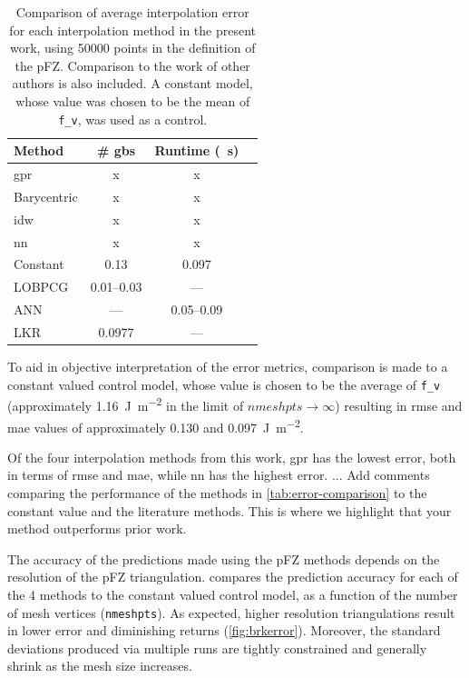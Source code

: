 \documentclass[preprint,12pt]{elsarticle}
\begin{document}
\begin{table}
\caption{Comparison of average interpolation error for each interpolation method in the present work, using \num{50000} points in the definition of the pFZ. Comparison to the work of other authors is also included. A constant model, whose value was chosen to be the mean of \texttt{f\_v}, was used as a control.}
\centering
\begin{tabular}{lccc}
\toprule
Method & \# \glspl{gb} & Runtime (\SI{}{\second}) \\
\midrule
\Gls{gpr} & x & x \\
Barycentric & x & x \\
\gls{idw} & x & x \\
\gls{nn} & x & x \\
Constant & 0.13 & 0.097 \\
LOBPCG \cite{shenDeterminingGrainBoundary2019} & 0.01--0.03 & --- \\
ANN \cite{echeverrirestrepoUsingArtificialNeural2014} & --- & 0.05--0.09 \\
LKR \cite{chesserLearningGrainBoundary2020} & 0.0977 & --- \\
\bottomrule
\end{tabular}
\label{tab:runtime-comparison}
\end{table}

To aid in objective interpretation of the error metrics, comparison is made to a constant valued control model, whose value is chosen to be the average of \texttt{f\_v} (approximately \SI{1.16}{\J\per\square\meter} in the limit of $nmeshpts \rightarrow \infty$) resulting in \gls{rmse} and \gls{mae} values of approximately \num{0.130} and \SI{0.097}{\J\per\square\meter}.

Of the four interpolation methods from this work, \Gls{gpr} has the lowest error, both in terms of \gls{rmse} and \gls{mae}, while \Gls{nn} has the highest error. ... Add comments comparing the performance of the methods in \cref{tab:error-comparison} to the constant value and the literature methods. This is where we highlight that your method outperforms prior work.

The accuracy of the predictions made using the pFZ methods depends on the resolution of the pFZ triangulation.  compares the prediction accuracy for each of the 4 methods to the constant valued control model, as a function of the number of mesh vertices (\texttt{nmeshpts}). As expected, higher resolution triangulations result in lower error and diminishing returns (\cref{fig:brkerror}). Moreover, the standard deviations produced via multiple runs are tightly constrained and generally shrink as the mesh size increases. 
\end{document}
